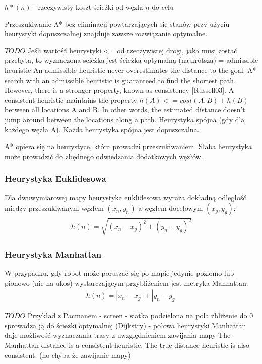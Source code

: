  $h*(n)$ - rzeczywisty koszt ścieżki od węzła $n$ do celu

Przeszukiwanie A* bez eliminacji powtarzających się stanów przy użyciu heurystyki dopuszczalnej znajduje zawsze rozwiązanie optymalne.

$TODO$ Jeśli wartość heurystyki <= od rzeczywistej drogi, jaka musi zostać przebyta, to wyznaczona scieżka jest ścieżką optymalną (najkrótszą)
= admissible heuristic
An admissible heuristic never overestimates the distance to the goal. A* search with an
admissible heuristic is guaranteed to find the shortest path. However, there is a stronger
property, known as consistency [Russell03]. A consistent heuristic maintains the property
$h(A) <= cost(A, B) + h(B)$ between all locations A and B. In other words, the estimated
distance doesn’t jump around between the locations along a path. \cite{cooppath}
Heurystyka spójna (gdy dla każdego węzła A).
Każda heurystyka spójna jest dopuszczalna.

A* opiera się na heurystyce, która prowadzi przeszukiwaniem. Słaba heurystyka może prowadzić do zbędnego odwiedzania dodatkowych węzłów.

\subsubsection{Heurystyka Euklidesowa}
Dla dwuwymiarowej mapy heurystyka euklidesowa wyraża dokładną odległość między przeszukiwanym węzłem $(x_n, y_n)$ a węzłem docelowym $(x_g, y_g)$:
\begin{gather}
 	h(n) = \sqrt{(x_n - x_g)^2 + (y_n - y_g)^2}
 	\label{eq_astar_heu_euc} 
\end{gather}

\subsubsection{Heurystyka Manhattan}
W przypadku, gdy robot może poruszać się po mapie jedynie poziomo lub pionowo (nie na ukos) wystarczającym przybliżeniem jest metryka Manhattan:
\begin{gather}
 	h(n) = |x_n - x_g| + |y_n - y_g|
 	\label{eq_astar_heu_man} 
\end{gather}

$TODO$ Przykład z Pacmanem - screen - siatka podzielona na pola
zbliżenie do 0 sprowadza ją do ścieżki optymalnej (Dijkstry) - połowa heurystyki Manhattan daje możliwość wyznaczania trasy z uwzględnieniem zawijania mapy
The Manhattan distance is a consistent heuristic. The true distance heuristic is also consistent. (no chyba że zawijanie mapy)

